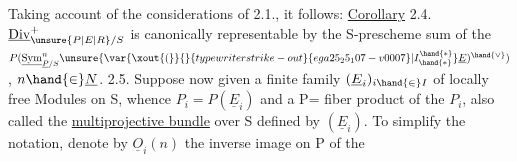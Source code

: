 Taking account of the considerations of 2.1., it follows:
\uline{Corollary} 2.4. $\underline{\mathrm{Div}}^{+}_{\unsure{P|E|R}/S}$ is canonically representable  by
the S-prescheme sum of the $P(\underline{\mathrm{Sym}}^{n}_{\underline{P}/S}\unsure{\var{\xout{(}}{}{typewriter strike-out}{ega25_25_107-v0007}|I^{\hand{*}}_{\hand{*}}}\underline{E})^{\hand{\vee}})$, $n \hand{\in} \underline{N}$.
2.5. Suppose now given a finite family $(\underline{E}_i)_{i \hand{\in} I}$ of locally free
Modules on S, whence $P_i = P(\underline{E}_i)$ and a P= fiber product of the
$P_i$, also called the \uline{multiprojective bundle} over S defined by $(\underline{E}_i)$. To
simplify the notation, denote by $\underline{O}_i(n)$ the inverse image on P of the

